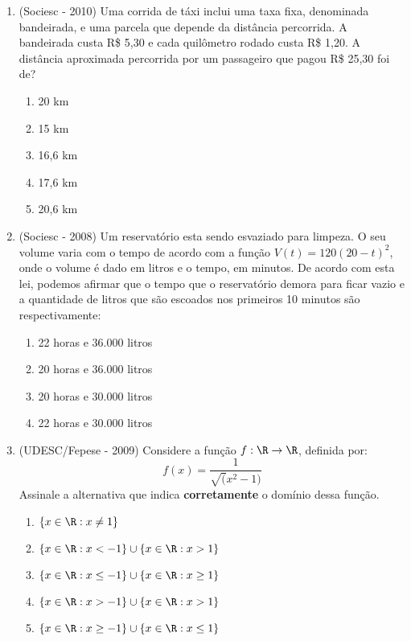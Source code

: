 \begin{enumerate}
 \item (Sociesc - 2010) Uma corrida de táxi inclui uma taxa fixa, denominada bandeirada, e uma parcela que depende da distância percorrida. A bandeirada custa R\$ 5,30 e cada quilômetro rodado custa R\$ 1,20. A distância aproximada percorrida por um passageiro que pagou R\$ 25,30 foi de?
  \begin{enumerate}
  \item 20 km
  \item 15 km
  \item 16,6 km
  \item 17,6 km
  \item 20,6 km
 \end{enumerate}
 
  \item (Sociesc - 2008) Um reservatório esta sendo esvaziado para limpeza. O seu volume varia com o tempo de acordo com a função $V(t)= 120(20 - t)^2$, onde o volume é dado em litros e o tempo, em minutos. De acordo com esta lei, podemos afirmar que o tempo que o reservatório demora para ficar vazio e a quantidade de litros que são escoados nos primeiros 10 minutos são respectivamente:
  \begin{enumerate}
  \item 22 horas e 36.000 litros
  \item 20 horas e 36.000 litros 
  \item 20 horas e 30.000 litros
  \item 22 horas e 30.000 litros
 \end{enumerate}
 
 \item (UDESC/Fepese - 2009) Considere a função $f: \R \to \R$, definida por:
 \[f(x)= \frac{1}{\sqrt(x^2 - 1)}\]
 Assinale a alternativa que indica \textbf{corretamente} o domínio dessa função.
 \begin{enumerate}
 \item $\{x \in \R: x \neq 1\}$
 \item $\{x \in \R: x < -1\} \cup \{x \in \R: x>1\}$
 \item $\{x \in \R: x \leq -1\} \cup \{x \in \R: x \geq 1\}$
 \item $\{x \in \R: x > -1\} \cup \{x \in \R: x>1\}$
 \item $\{x \in \R: x \geq -1\} \cup \{x \in \R: x\leq 1\}$
 
 \end{enumerate}

 \end{enumerate}
 

